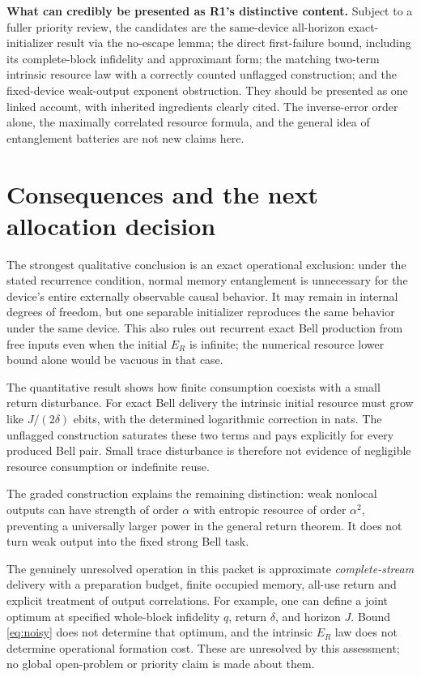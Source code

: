 \documentclass[11pt,a4paper]{article}
\numberwithin{equation}{section}
\theoremstyle{remark}
\newcommand{\ER}{E_R}
\begin{document}
\textbf{What can credibly be presented as R1's distinctive content.}
Subject to a fuller priority review, the candidates are the
same-device all-horizon exact-initializer result via the no-escape lemma;
the direct first-failure bound, including its complete-block
infidelity and approximant form; the matching two-term intrinsic
resource law with a correctly counted unflagged construction; and the
fixed-device weak-output exponent obstruction. They should be presented
as one linked account, with inherited ingredients clearly cited.
The inverse-error order alone, the maximally correlated resource formula,
and the general idea of entanglement batteries are not new claims here.

\section{Consequences and the next allocation decision}
The strongest qualitative conclusion is an exact operational exclusion:
under the stated recurrence condition, normal memory entanglement is
unnecessary for the device's entire externally observable causal behavior.
It may remain in internal degrees of freedom, but one separable
initializer reproduces the same behavior under the same device.
This also rules out recurrent exact Bell production from free inputs
even when the initial \(\ER\) is infinite; the numerical resource lower
bound alone would be vacuous in that case.

The quantitative result shows how finite consumption coexists with a small
return disturbance. For exact Bell delivery the intrinsic initial
resource must grow like \(J/(2\delta)\) ebits, with the determined
logarithmic correction in nats. The unflagged construction saturates these
two terms and pays explicitly for every produced Bell pair.
Small trace disturbance is therefore not evidence of negligible resource
consumption or indefinite reuse.

The graded construction explains the remaining distinction: weak nonlocal
outputs can have strength of order \(\alpha\) with entropic resource
of order \(\alpha^2\), preventing a universally larger power in the general
return theorem. It does not turn weak output into the fixed strong Bell task.

The genuinely unresolved operation in this packet is approximate
\emph{complete-stream} delivery with a preparation budget, finite occupied
memory, all-use return and explicit treatment of output correlations.
For example, one can define a joint optimum at specified whole-block
infidelity \(q\), return \(\delta\), and horizon \(J\). Bound
\eqref{eq:noisy} does not determine that optimum, and the intrinsic
\(\ER\) law does not determine operational formation cost.
These are unresolved by this assessment; no global open-problem or
priority claim is made about them.
\end{document}
